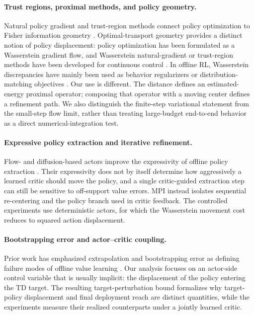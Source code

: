 \paragraph{Trust regions, proximal methods, and policy geometry.}
Natural policy gradient and trust-region methods connect policy optimization
to Fisher information geometry \citep{amari2000methods,schulman2015trust}.
Optimal-transport geometry provides a distinct notion of policy displacement:
policy optimization has been formulated as a Wasserstein gradient flow, and
Wasserstein natural-gradient or trust-region methods have been developed for
continuous control \citep{zhang2018policy,moskovitz2020efficient,terpin2022trust,song2023metric}.
In offline RL, Wasserstein discrepancies have mainly been used as behavior
regularizers or distribution-matching objectives
\citep{wu2019brac,asadulaev2024rethinking}. Our use is different. The distance
defines an estimated-energy proximal operator; composing that operator with a
moving center defines a refinement path. We also distinguish the finite-step
variational statement from the small-step flow limit, rather than treating
large-budget end-to-end behavior as a direct numerical-integration test.

\paragraph{Expressive policy extraction and iterative refinement.}
Flow- and diffusion-based actors improve the expressivity of offline policy
extraction \citep{park2025flow,wang2023diffusion}. Their expressivity does not
by itself determine how aggressively a learned critic should move the policy,
and a single critic-guided extraction step can still be sensitive to
off-support value errors. MPI instead isolates sequential re-centering and the
policy branch used in critic feedback. The controlled experiments use
deterministic actors, for which the Wasserstein movement cost reduces to
squared action displacement.

\paragraph{Bootstrapping error and actor--critic coupling.}
Prior work has emphasized extrapolation and bootstrapping error as defining
failure modes of offline value learning \citep{fujimoto2019offpolicy,kumar2019bear,kumar2020cql}.
Our analysis focuses on an actor-side control variable that is usually
implicit: the displacement of the policy entering the TD target. The resulting
target-perturbation bound formalizes why target-policy displacement and final
deployment reach are distinct quantities, while the experiments measure their
realized counterparts under a jointly learned critic.
